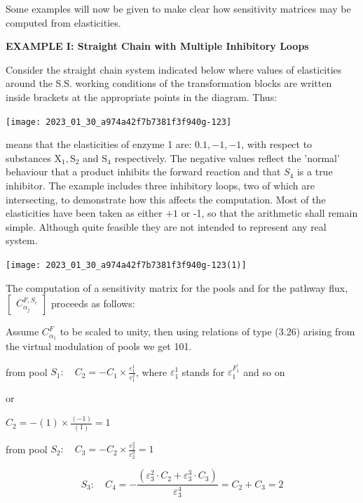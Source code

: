 Some examples will now be given to make clear how sensitivity matrices may be computed from elasticities.

{\bf\large EXAMPLE I: Straight Chain with Multiple Inhibitory Loops}

Consider the straight chain system indicated below where values of elasticities around the S.S. working conditions of the transformation blocks are written inside brackets at the appropriate points in the diagram. Thus:

\begin{center}
\texttt{[image: 2023\_01\_30\_a974a42f7b7381f3f940g-123]}
\end{center}

means that the elasticities of enzyme 1 are: $0.1,-1,-1$, with respect to substances $\mathrm{X}_{1}, \mathrm{S}_{2}$ and $\mathrm{S}_{4}$ respectively. The negative values reflect the 'normal' behaviour that a product inhibits the forward reaction and that $S_{4}$ is a true inhibitor. The example includes three inhibitory loops, two of which are intersecting, to demonstrate how this affects the computation. Most of the elasticities have been taken as either $+1$ or -1, so that the arithmetic shall remain simple. Although quite feasible they are not intended to represent any real system.

\texttt{[image: 2023\_01\_30\_a974a42f7b7381f3f940g-123(1)]}

The computation of a sensitivity matrix for the pools and for the pathway flux,$\left[\begin{array}{c} C^{F, S_{i}}_{\alpha_j}\end{array}\right]$ proceeds as follows:

Assume $C_{\alpha_{1}}^{F}$ to be scaled to unity, then using relations of type (3.26) arising from the virtual modulation of pools we get 101.

from pool $S_{1}: \quad C_{2}=-C_{1} \times \frac{\varepsilon_{1}^{1}}{\varepsilon_{1}^{2}}$, where $\varepsilon_{1}^{1}$ stands for $\varepsilon_{1}^{F_{1}^{\prime}}$ and so on

or

$C_{2} = -(1) \times \frac{(-1)}{(1)}=1$

from pool $S_{2}: \quad C_{3}=-C_{2} \times \frac{\varepsilon_{2}^{2}}{\varepsilon_{2}^{3}}=1$

$$S_{3}: \quad C_{4} = -\frac{\left(\varepsilon^{2}_3 \cdot C_{2} + \varepsilon^{3}_3 \cdot C_{3}\right)}{\varepsilon^{4}_3} = C_{2}+ C_{3}=2$$

